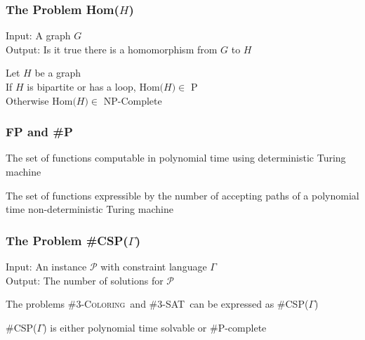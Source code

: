 \documentclass[a4paper,handout]{beamer}
\newcommand{\pname}[1]{\textsc{#1}}
\newcommand{\ccsp}{\#CSP}
\newcommand{\cp}{\#P}
\newcommand{\cpc}{\#P-complete}
\newcommand{\ctsat}{\#3-SAT}
\newcommand{\ctcol}{\#3-\pname{Coloring}}
\theoremstyle{definition}
\begin{document}
\begin{frame}
\frametitle{The Problem Hom(\(H\))}
\begin{definition} 
Input: A graph \(G\)\\
Output: Is it true there is a homomorphism from \(G\) to \(H\)
\end{definition}
\vskip 24pt
\begin{theorem} 
Let \(H\) be a graph\\
If \(H\) is \textcolor{mygreen}{bipartite} or has a \textcolor{mygreen}{loop}, \(\mathrm{Hom(}H\mathrm{)} \in\) P\\
Otherwise \(\mathrm{Hom(}H\mathrm{)} \in\) NP-Complete
\end{theorem}
\end{frame}

\begin{frame}
\frametitle{FP and \cp}
\begin{definition} [FP]
The set of functions computable in polynomial time using deterministic Turing machine
\end{definition}

\vskip 36pt
\begin{definition}[\cp]
The set of functions expressible by the number of accepting paths of a polynomial time non-deterministic Turing machine
\end{definition}
\end{frame}

\begin{frame}
\frametitle{The Problem \ccsp(\(\Gamma\))}
\begin{definition} [The Problem \ccsp(\(\Gamma\))]
Input: An instance \(\mathcal{P}\) with constraint language \(\Gamma\) \\
Output: The number of solutions for \(\mathcal{P}\)
\end{definition}

\pause
\vskip 12pt
The problems \ctcol\ and \ctsat\ can be expressed as \ccsp(\(\Gamma\))
\pause
\vskip 12pt

\begin{theorem} [Bulatov 2008]
\ccsp(\(\Gamma\)) is either polynomial time solvable or \cpc
\end{theorem}
\end{frame}
\end{document}

